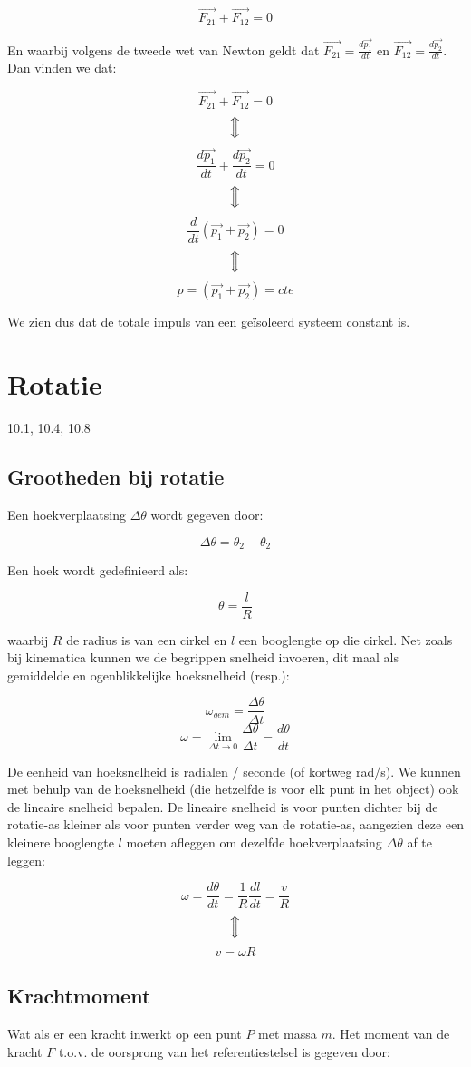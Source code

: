 \documentclass[12pt,a4paper]{article}
\newcommand{\Luda}{\Big\Updownarrow}
\begin{document}
    $$\vec{F_{21}} + \vec{F_{12}} = 0$$
    
    En waarbij volgens de tweede wet van Newton geldt dat $\vec{F_{21}} = \frac{d\vec{p_1}}{dt}$ en 
    $\vec{F_{12}} = \frac{d\vec{p_2}}{dt}$. Dan vinden we dat:
    
     $$\vec{F_{21}} + \vec{F_{12}} = 0$$
     $$\Luda$$
     $$\frac{d\vec{p_1}}{dt} + \frac{d\vec{p_2}}{dt} = 0$$
     $$\Luda$$
     $$\frac{d}{dt}(\vec{p_1} + \vec{p_2}) = 0$$
     $$\Luda$$
     $$p = (\vec{p_1} + \vec{p_2}) = cte$$

    We zien dus dat de totale impuls van een geïsoleerd systeem constant is. 

    \section{Rotatie}
    10.1, 10.4, 10.8
    
    \subsection{Grootheden bij rotatie}
    Een hoekverplaatsing $\Delta \theta$ wordt gegeven door:
    
    $$\Delta \theta = \theta_{2} - \theta_{2}$$
    
    Een hoek wordt gedefinieerd als:
    
    $$\theta = \frac{l}{R}$$ 
    
    waarbij $R$ de radius is van een cirkel en $l$ een booglengte op die cirkel. Net zoals bij kinematica kunnen we de begrippen
    snelheid invoeren, dit maal als gemiddelde en ogenblikkelijke hoeksnelheid (resp.):
    
    $$\omega_{gem} = \frac{\Delta \theta}{\Delta t}$$
    $$\omega = \lim_{\Delta t \to 0} \frac{\Delta \theta}{\Delta t} = \frac{d\theta}{dt}$$
    
    De eenheid van hoeksnelheid is radialen / seconde (of kortweg rad/s). We kunnen met behulp van de hoeksnelheid
    (die hetzelfde is voor elk punt in het object) ook de lineaire snelheid bepalen. De lineaire snelheid is voor punten dichter
    bij de rotatie-as kleiner als voor punten verder weg van de rotatie-as, aangezien deze een kleinere booglengte $l$
    moeten afleggen om dezelfde hoekverplaatsing $\Delta \theta$ af te leggen:
    
    $$\omega = \frac{d\theta}{dt} = \frac{1}{R} \frac{dl}{dt} = \frac{v}{R}$$
    $$\Luda$$
    $$v = \omega R$$

    \subsection{Krachtmoment}
    Wat als er een kracht inwerkt op een punt $P$ met massa $m$. Het moment van de kracht $F$ 
    t.o.v. de oorsprong van het referentiestelsel is gegeven door:
    
\end{document}
